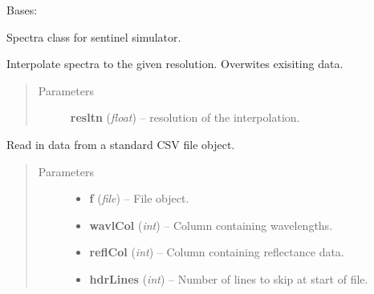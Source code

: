 \documentclass[letterpaper,10pt,english]{sphinxmanual}
\begin{document}
\begin{fulllineitems}
\label{source/sentinelSimulator:sentinelSimulator.spectra.spectra}
Bases: 

Spectra class for sentinel simulator.

\begin{fulllineitems}
\label{source/sentinelSimulator:sentinelSimulator.spectra.spectra.interpolate}
Interpolate spectra to the given resolution.
Overwites exisiting data.
\begin{quote}\begin{description}
\item[{Parameters}] \leavevmode
\textbf{resltn} (\emph{float}) -- resolution of the interpolation.

\end{description}\end{quote}

\end{fulllineitems}


\begin{fulllineitems}
\label{source/sentinelSimulator:sentinelSimulator.spectra.spectra.loadCSV}
Read in data from a standard CSV file object.
\begin{quote}\begin{description}
\item[{Parameters}] \leavevmode\begin{itemize}
\item {} 
\textbf{f} (\emph{file}) -- File object.

\item {} 
\textbf{wavlCol} (\emph{int}) -- Column containing wavelengths.

\item {} 
\textbf{reflCol} (\emph{int}) -- Column containing reflectance data.

\item {} 
\textbf{hdrLines} (\emph{int}) -- Number of lines to skip at start of file.


\end{itemize}
\end{description}
\end{quote}
\end{fulllineitems}
\end{fulllineitems}
\end{document}
